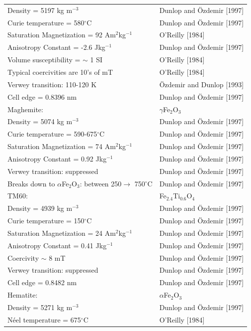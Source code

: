 \begin{center}
\begin{longtable}{ll}
Density = 5197 kg m$^{-3}$& Dunlop and \"Ozdemir [1997]\\
{Curie temperature}  = 580$^{\circ}$C & Dunlop and \"Ozdemir [1997]\\
{Saturation Magnetization}  = 92 Am$^2$kg$^{-1}$&O'Reilly [1984]\\
{Anisotropy Constant} = -2.6 {Jkg}$^{-1}$&  Dunlop and \"Ozdemir [1997]\\
{Volume susceptibility} = $\sim$ 1 SI& O'Reilly [1984]\\
 {Typical coercivities are 10's of mT}& O'Reilly [1984] \\
 Verwey transition: 110-120 K& \" Ozdemir and Dunlop [1993]\\
Cell edge = 0.8396 nm & Dunlop and \"Ozdemir [1997]\\
\hline
Maghemite:&$\gamma$Fe$_2$O$_3$\\
Density = 5074 kg m$^{-3}$& Dunlop and \"Ozdemir [1997]\\
{Curie temperature}  = 590-675$^{\circ}$C & Dunlop and \"Ozdemir [1997]\\
{Saturation Magnetization}  = 74 Am$^2$kg$^{-1}$& Dunlop and \"Ozdemir
[1997]\\
{Anisotropy Constant} = 0.92 {Jkg}$^{-1}$&  Dunlop and \"Ozdemir [1997]\\
 Verwey transition: suppressed& Dunlop and \"Ozdemir [1997]\\ 
Breaks down to $\alpha$Fe$_2$O$_3$: between 250$\rightarrow$ 
750$^{\circ}$C &
Dunlop and \"Ozdemir [1997]\\
\hline
TM60:&Fe$_{2.4}$Ti$_{0.6}$O$_4$\\
Density = 4939 kg m$^{-3}$& Dunlop and \"Ozdemir [1997]\\
{Curie temperature}  = 150$^{\circ}$C & Dunlop and \"Ozdemir [1997]\\
{Saturation Magnetization}  = 24 Am$^2$kg$^{-1}$& Dunlop and \"Ozdemir
[1997]\\
{Anisotropy Constant} = 0.41 {Jkg}$^{-1}$&  Dunlop and \"Ozdemir [1997]\\
 {Coercivity $\sim$ 8 mT}& Dunlop and \"Ozdemir [1997]\\
Verwey transition: suppressed&Dunlop and \"Ozdemir [1997]\\
Cell edge = 0.8482 nm &Dunlop and \"Ozdemir [1997]\\
\hline
{Hematite:}&$\alpha$Fe$_2$O$_3$\\
Density = 5271 kg m$^{-3}$& Dunlop and \"Ozdemir [1997]\\
{N\' eel temperature} = 675$^{\circ}$C&O'Reilly [1984]\\

\end{longtable}
\end{center}
